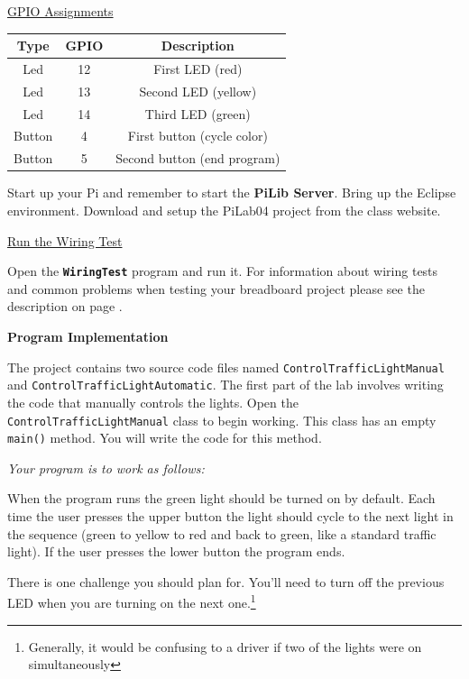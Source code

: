 \underline{GPIO Assignments}

\begin{center}
	\begin{tabular}{c | c | c}
		\hline
		\textbf{Type} & \textbf{GPIO} & \textbf{Description} \\ \hline
		Led & 12 & First LED (red) \\ 
		\hline
		Led & 13 & Second LED (yellow) \\ 
		\hline
		Led & 14 & Third LED (green) \\ 
		\hline
		Button & 4 & First button (cycle color) \\ 
		\hline
		Button & 5 & Second button (end program) \\ 
		\hline	
	\end{tabular}
\end{center}

\vspace{10pt}

Start up your Pi and remember to start the \textbf{PiLib Server}. Bring up the Eclipse environment. Download and setup the PiLab04 project from the class website.

\underline{Run the Wiring Test}

Open the \textbf{\texttt{WiringTest}} program and run it. For information about wiring tests and common problems when testing your breadboard project please see the description on page \pageref{wiringTestDescription}.

\newpage

\textbf{Program Implementation}

The project contains two source code files named \texttt{ControlTrafficLightManual} and \texttt{ControlTrafficLightAutomatic}. The first part of the lab involves writing the code that manually controls the lights. Open the \texttt{ControlTrafficLightManual} class to begin working. This class has an empty \texttt{main()} method. You will write the code for this method.

\textit{Your program is to work as follows:}

When the program runs the green light should be turned on by default. Each time the user presses the upper button the light should cycle to the next light in the sequence (green to yellow to red and back to green, like a standard traffic light). If the user presses the lower button the program ends.

There is one challenge you should plan for. You'll need to turn off the previous LED when you are turning on the next one.\footnote{Generally, it would be confusing to a driver if two of the lights were on simultaneously} 

